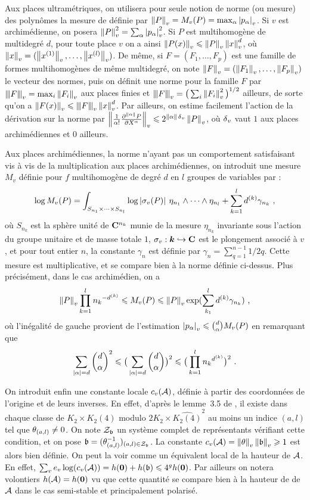 Aux places ultramétriques, on utilisera pour seule notion de norme (ou mesure)
des polynômes la mesure de  définie par $\nv P = \mv P =
\max_\alpha \av{p_\alpha}$. Si $v$ est archimédienne, on posera $\nv P ^2 =
\sum_\alpha \av{p_\alpha}^2$. Si $P$ est multihomogène de multidegré $d$, pour
toute place $v$ on a ainsi $\nv {P(x)} \le \nv P \nv x ^d$, où $\nv x =
(\nv{x^{(1)}}, \dots , \nv{x^{(l)}})$. De même, si $F = (F_1, \dots, F_p)$ est
une famille de formes multihomogènes de même multidegré, on note $\nv F =
(\nv{F_1}, \dots, \nv{F_p})$ le vecteur des normes, puis on définit une norme
pour la famille $F$ par $\nnv F = \max_i \nv{F_i}$ aux places finies et $\nnv
F = \big(\sum_i \nv{F_i}^2 \big)^{1/2}$ ailleurs, de sorte qu'on a $\nv{F(x)}
\le \nnv F \nv x^d$. Par ailleurs, on estime facilement l'action de la
dérivation sur la norme par $\nv {\frac1 {\alpha !}
  \frac{\partial^{\lgt\alpha}P}{\partial X^\alpha}} \le 2^{\lgt\alpha \, \dv}
\nv P$, où $\dv$ vaut $1$ aux places archimédiennes et $0$ ailleurs.

Aux places archimédiennes, la norme n'ayant pas un comportement satisfaisant
vis à vis de la multiplication aux places archimédiennes, on introduit une
mesure $M_v$ définie pour $f$ multihomogène de degré $d$ en $l$ groupes de
variables par :
\[
  \log \mv P = \int_{S_{n_1} \times \cdots \times S_{n_l}} \log
  \av[]{\sigma_v(P)} \, \eta_{n_1}\wedge\cdots\wedge \eta_{n_l} + \sum_{k=1}^l
  d^{(k)} \gamma_{n_k} \pmm,
\]
où $S_{n_k}$ est la sphère unité de $\C^{n_k}$ munie de la mesure $\eta_{n_k}$
invariante sous l'action du groupe unitaire et de masse totale $1$, $\sigma_v
: \cdn \hookrightarrow \C$ est le plongement associé à $v$, et pour tout
entier $n$, la constante $\gamma_n$ est définie par $\gamma_n =
\sum_{q=1}^{n-1} 1/2q$. Cette mesure est multiplicative, et se compare bien à
la norme définie ci-dessus. Plus précisément, dans le cas archimédien, on a
\[
  \nv P  \prod_{k=1}^l {n_k}^{-d^{(k)}}
  \le \mv P
  \le \nv P \exp(\sum_{k_1}^l d^{(k)} \gamma_{n_k}) \pmm,
\]
où l'inégalité de gauche provient de l'estimation $\av{p_\alpha} \le
\binom{d}{\alpha} \mv P$ \cite[dém. du lemme~3.3]{rem1} en remarquant que
\[
 \sum_{\vlg\alpha = d} \binom{d}{\alpha}^2 \le \big(\sum_{\vlg\alpha = d}
 \binom{d}{\alpha}\big)^2 \le \big(\prod_{k=1}^l {n_k}^{d^{(k)}}\big)^2 \pmm.
\]

On introduit enfin une constante locale $c_v(\A)$, définie à partir des
coordonnées de l'origine et de leurs inverses. En effet, d'après le lemme~3.5
de \cite{daphi}, il existe dans chaque classe de $K_2 \times \widehat{K_2(4)}$
modulo $2K_2 \times \widehat{K_2(4)}^2$ au moins un indice $(a, l)$ tel que
$\coa_{(a,l)} \neq 0$. On note $\mathcal{Z}_\BA$ un système complet de
représentants vérifiant cette condition, et on pose $\BA = (\coa_{(a,
  l)}^{-1})_{(a, l) \in \mathcal{Z}_\BA}$. La constante $c_v(\A) =
\nv{\coa}\nv{\BA} \ge 1$ est alors bien définie. On peut la voir comme un
équivalent local de la hauteur de $\A$. En effet, $\sum_v e_v \log (c_v(\A)) =
h(\OA) + h(\BA) \le 4^g h(\OA)$. Par ailleurs on notera volontiers $h(\A) =
h(\OA)$ vu que cette quantité se compare bien à la hauteur de 
de $\A$ dans le cas semi-stable et principalement polarisé.

